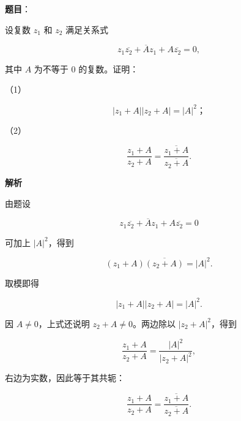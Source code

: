 \begin{answer}

\textbf{题目}：

设复数 $z_1$ 和 $z_2$ 满足关系式

\nopagebreak[4]
\[
z_1\overline{z_2}+\overline A z_1+A\overline{z_2}=0,
\]

其中 $A$ 为不等于 0 的复数。证明：

（1）　

\nopagebreak[4]
\[
|z_1+A||z_2+A|=|A|^2\text{；}
\]

（2）　

\nopagebreak[4]
\[
\frac{z_1+A}{z_2+A}
=\frac{\overline{z_1+A}}{\overline{z_2+A}}.
\]

\textbf{解析}


由题设

\nopagebreak[4]
\[
z_1\overline{z_2}+\overline A z_1+A\overline{z_2}=0
\]

可加上 $|A|^2$，得到

\nopagebreak[4]
\[
(z_1+A)\overline{(z_2+A)}=|A|^2.
\]

取模即得

\nopagebreak[4]
\[
|z_1+A||z_2+A|=|A|^2.
\]


因 $A\ne0$，上式还说明 $z_2+A\ne0$。两边除以 $|z_2+A|^2$，得到

\nopagebreak[4]
\[
\frac{z_1+A}{z_2+A}
=\frac{|A|^2}{|z_2+A|^2},
\]

右边为实数，因此等于其共轭：

\nopagebreak[4]
\[
\frac{z_1+A}{z_2+A}
=\frac{\overline{z_1+A}}{\overline{z_2+A}}.
\]



\end{answer}
